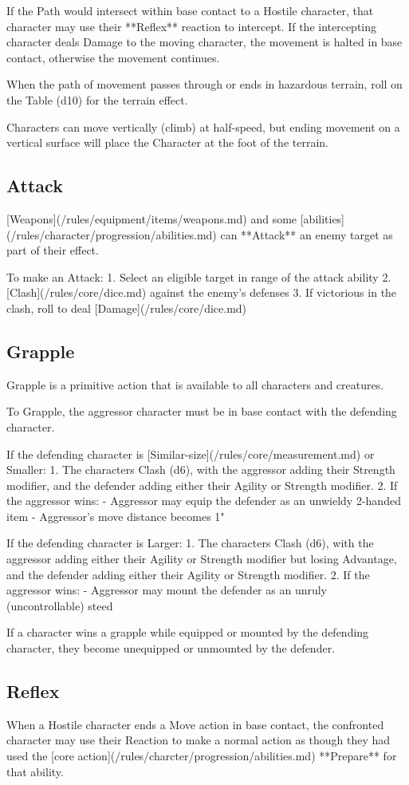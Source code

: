 If the Path would intersect within base contact to a Hostile character, 
that character may use their **Reflex** reaction to intercept.
If the intercepting character deals Damage to the moving character, 
the movement is halted in base contact,
otherwise the movement continues.

When the path of movement passes through or ends in hazardous terrain, 
roll on the Table (d10) for the terrain effect.

Characters can move vertically (climb) at half-speed, 
but ending movement on a vertical surface will place the Character at the foot of the terrain.
\subsection{Attack}
[Weapons](/rules/equipment/items/weapons.md)
and some [abilities](/rules/character/progression/abilities.md) 
can **Attack** an enemy target as part of their effect.

To make an Attack:
1. Select an eligible target in range of the attack ability
2. [Clash](/rules/core/dice.md) against the enemy's defenses
3. If victorious in the clash, roll to deal [Damage](/rules/core/dice.md)
\subsection{Grapple}
Grapple is a primitive action that is available to all characters and creatures. 

To Grapple, the aggressor character must be in base contact with the defending character.

If the defending character is [Similar-size](/rules/core/measurement.md) or Smaller:
1. The characters Clash (d6), with the aggressor adding their Strength modifier, 
and the defender adding either their Agility or Strength modifier.
2. If the aggressor wins:
- Aggressor may equip the defender as an unwieldy 2-handed item
- Aggressor's move distance becomes 1"

If the defending character is Larger:
1. The characters Clash (d6), 
with the aggressor adding either their Agility or Strength modifier but losing Advantage, 
and the defender adding either their Agility or Strength modifier.
2. If the aggressor wins:
- Aggressor may mount the defender as an unruly (uncontrollable) steed

If a character wins a grapple while equipped or mounted by the defending character, 
they become unequipped or unmounted by the defender.
\subsection{Reflex}
When a Hostile character ends a Move action in base contact, 
the confronted character may use their Reaction to make a normal action 
as though they had used the [core action](/rules/charcter/progression/abilities.md) **Prepare** for that ability.

